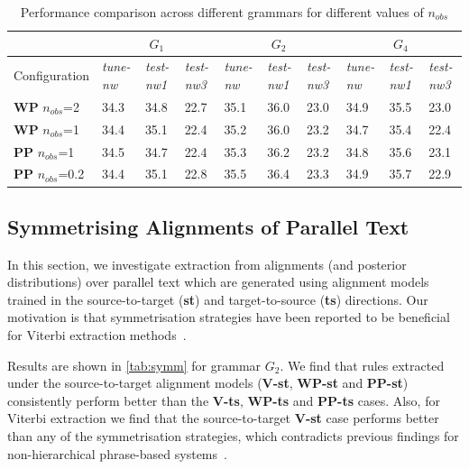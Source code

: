 \begin{table}
  \centering
  \begin{tabular}{*{10}{|l}|}
    \hline
    &  &  &  \\
    \hline
    Configuration & {\em tune-nw} & {\em test-nw1} & {\em test-nw3} & {\em tune-nw} & {\em test-nw1} & {\em test-nw3} & {\em tune-nw} & {\em test-nw1} & {\em test-nw3} \\
    \hline
        {\bf WP} $n_{obs}$=2 & 34.3 & 34.8  & 22.7 & 35.1 & 36.0 & 23.0 & 34.9 & 35.5 & 23.0 \\
        \hline
            {\bf WP} $n_{obs}$=1 & 34.4 & 35.1 & 22.4 & 35.2 & 36.0 & 23.2 & 34.7 & 35.4 & 22.4 \\
            \hline
                {\bf PP} $n_{obs}$=1 & 34.5 &  34.7 & 22.4 & 35.3 & 36.2 & 23.2 & 34.8 & 35.6 & 23.1 \\
                \hline
                    {\bf PP} $n_{obs}$=0.2 & 34.4 & 35.1 & 22.8 & 35.5 & 36.4 & 23.3 & 34.9 & 35.7 & 22.9 \\
                    \hline
  \end{tabular}
  \caption{Performance comparison across different grammars for different values of $n_{obs}$}
  \label{tab:nocc}
\end{table}

\subsection{Symmetrising Alignments of Parallel Text}
\label{sec:extractionFromPosteriorsSymmetrising}

In this section, we investigate extraction from alignments (and posterior
distributions) over parallel text which are generated using alignment models
trained in the source-to-target ({\bf st}) and target-to-source ({\bf ts})
directions. Our motivation is that symmetrisation strategies have been reported
to be beneficial for Viterbi extraction
methods~\citep{koehn-och-marcu:2003:NAACL}. 

Results are shown in \autoref{tab:symm} for grammar $G_2$. We find that rules
extracted under the source-to-target alignment models ({\bf V-st}, {\bf WP-st}
and {\bf PP-st}) consistently perform better than the {\bf V-ts}, {\bf WP-ts}
and {\bf PP-ts} cases. Also, for Viterbi extraction we find that the
source-to-target {\bf V-st} case performs better than any of the symmetrisation
strategies, which contradicts previous findings for non-hierarchical
phrase-based systems~\citep{koehn-och-marcu:2003:NAACL}.
  
